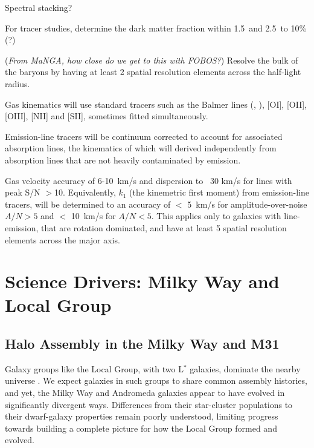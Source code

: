 \documentclass[11pt,a4paper,twoside,onecolumn,openany,final,oldfontcommands]{memoir}
\begin{document}
\begin{sciencerequirement}
\reqitem Spectral stacking?

\reqitem For tracer studies, determine the dark matter fraction within 1.5\Reff\ and 2.5\Reff\ to 10\% (?)


\reqitem (\emph{From MaNGA, how close do we get to this with FOBOS?}) Resolve the bulk of the baryons by having at least 2 spatial resolution elements across the half-light radius.

\reqitem  Gas kinematics will use standard tracers such as the Balmer lines (\Hbeta, \Halpha), [OI], [OII], [OIII], [NII] and [SII], sometimes fitted simultaneously. 

\reqitem  Emission-line tracers will be continuum corrected to account for associated absorption lines, the kinematics of which will derived independently from absorption lines that are not heavily contaminated by emission.

\reqitem Gas velocity accuracy of 6-10~km/s and dispersion to ~30 km/s for lines with peak S/N $>$10.  Equivalently, $k_1$ (the kinemetric first moment) from emission-line tracers, will be determined to an accuracy of $<$ 5~km/s for amplitude-over-noise $A/N>5$ and $<$ 10~km/s for $A/N<5$. This applies only to galaxies with line-emission, that are rotation dominated, and have at least 5 spatial resolution elements across the major axis. 

\end{sciencerequirement}

\newpage

\chapter{Science Drivers: Milky Way and Local Group} \label{sci:localgroup}

\section{Halo Assembly in the Milky Way and M31}

Galaxy groups like the Local Group, with two L$^*$ galaxies, dominate the nearby universe \citep{kourkchi17}.  We expect galaxies in such groups to share common assembly histories, and yet, the Milky Way and Andromeda galaxies appear to have evolved in significantly divergent ways.  Differences from their star-cluster populations to their dwarf-galaxy properties remain poorly understood, limiting progress towards building a complete picture for how the Local Group formed and evolved.
\end{document}
